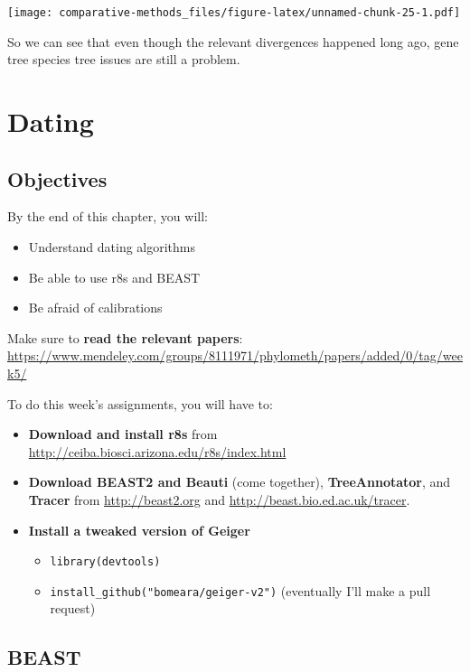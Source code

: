 \documentclass[]{article}
\providecommand{\tightlist}{%
  \setlength{\itemsep}{0pt}\setlength{\parskip}{0pt}}
\theoremstyle{definition}
\theoremstyle{definition}
\theoremstyle{definition}
\theoremstyle{remark}
\begin{document}
\texttt{[image: comparative-methods\_files/figure-latex/unnamed-chunk-25-1.pdf]}

So we can see that even though the relevant divergences happened long
ago, gene tree species tree issues are still a problem.

\hypertarget{dating}{%
\section{Dating}\label{dating}}

\hypertarget{objectives-8}{%
\subsection{Objectives}\label{objectives-8}}

By the end of this chapter, you will:

\begin{itemize}
\tightlist
\item
  Understand dating algorithms
\item
  Be able to use r8s and BEAST
\item
  Be afraid of calibrations
\end{itemize}

Make sure to \textbf{read the relevant papers}:
\url{https://www.mendeley.com/groups/8111971/phylometh/papers/added/0/tag/week5/}

To do this week's assignments, you will have to:

\begin{itemize}
\tightlist
\item
  \textbf{Download and install r8s} from
  \url{http://ceiba.biosci.arizona.edu/r8s/index.html}
\item
  \textbf{Download BEAST2 and Beauti} (come together),
  \textbf{TreeAnnotator}, and \textbf{Tracer} from
  \url{http://beast2.org} and \url{http://beast.bio.ed.ac.uk/tracer}.
\item
  \textbf{Install a tweaked version of Geiger}

  \begin{itemize}
  \tightlist
  \item
    \texttt{library(devtools)}
  \item
    \texttt{install\_github("bomeara/geiger-v2")} (eventually I'll make
    a pull request)
  \end{itemize}
\end{itemize}

\hypertarget{beast}{%
\subsection{BEAST}\label{beast}}
\end{document}
